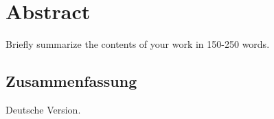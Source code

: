 \begingroup
\let\clearpage\relax
\let\cleardoublepage\relax
\let\cleardoublepage\relax


\chapter*{Abstract}

Briefly summarize the contents of your work in 150-250 words.
\lipsum[1]

\newpage


\begin{otherlanguage}{ngerman}
\chapter*{Zusammenfassung}

Deutsche Version.
\lipsum[1]

\end{otherlanguage}

\endgroup

\vfill
